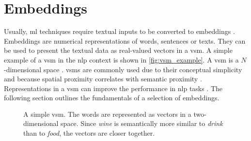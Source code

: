 \section{Embeddings}\label{sec:embeddings}

Usually, \ac{ml} techniques require textual inputs to be converted to embeddings \cite{SentRep2014}.
Embeddings are numerical representations of words, sentences or texts.
They can be used to present the textual data as real-valued vectors in a \ac{vsm}.
A simple example of a \ac{vsm} in the \ac{nlp} context is shown in \autoref{fig:vsm_example}.
A \ac{vsm} is a $N$-dimensional space \cite{soft_cosine2014}.
\acp{vsm} are commonly used due to their conceptual simplicity and because spatial proximity correlates with semantic proximity 
\cite{tfidf2008, UniversalSentEnc2018, HfsentTrans2019, Top2Vec2020}.
Representations in a \ac{vsm} can improve the performance in \ac{nlp} tasks \cite{SkipGram2013}.
The following section outlines the fundamentals of a selection of embeddings.

\begin{figure}[!htp] %
    \centering
    
    \caption[A simple \acs*{vsm}]
    {A simple \acs*{vsm}. 
    The words are represented as vectors in a two-dimensional space.
    Since \textit{wine} is semantically more similar to \textit{drink} than to \textit{food}, the vectors are closer together.
    }
    \label{fig:vsm_example}
\end{figure}












